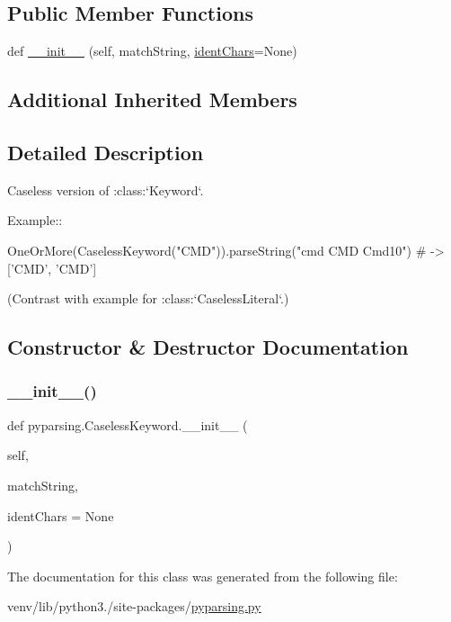 \subsection*{Public Member Functions}
\begin{DoxyCompactItemize}
\item 
def \hyperlink{classpyparsing_1_1CaselessKeyword_af0676539aa39e6286a66ba54ac036908}{\+\_\+\+\_\+init\+\_\+\+\_\+} (self, match\+String, \hyperlink{classpyparsing_1_1Keyword_aa72a7dfb352a7054aded6f295162b474}{ident\+Chars}=None)
\end{DoxyCompactItemize}
\subsection*{Additional Inherited Members}


\subsection{Detailed Description}
\begin{DoxyVerb}Caseless version of :class:`Keyword`.

Example::

    OneOrMore(CaselessKeyword("CMD")).parseString("cmd CMD Cmd10") # -> ['CMD', 'CMD']

(Contrast with example for :class:`CaselessLiteral`.)
\end{DoxyVerb}
 

\subsection{Constructor \& Destructor Documentation}
\mbox{\label{classpyparsing_1_1CaselessKeyword_af0676539aa39e6286a66ba54ac036908}} 
\subsubsection{\texorpdfstring{\+\_\+\+\_\+init\+\_\+\+\_\+()}{\_\_init\_\_()}}
{\footnotesize\ttfamily def pyparsing.\+Caseless\+Keyword.\+\_\+\+\_\+init\+\_\+\+\_\+ (\begin{DoxyParamCaption}\item[{}]{self,  }\item[{}]{match\+String,  }\item[{}]{ident\+Chars = {\ttfamily None} }\end{DoxyParamCaption})}



The documentation for this class was generated from the following file\+:\begin{DoxyCompactItemize}
\item 
venv/lib/python3./site-\/packages/\hyperlink{pyparsing_8py}{pyparsing.\+py}\end{DoxyCompactItemize}
